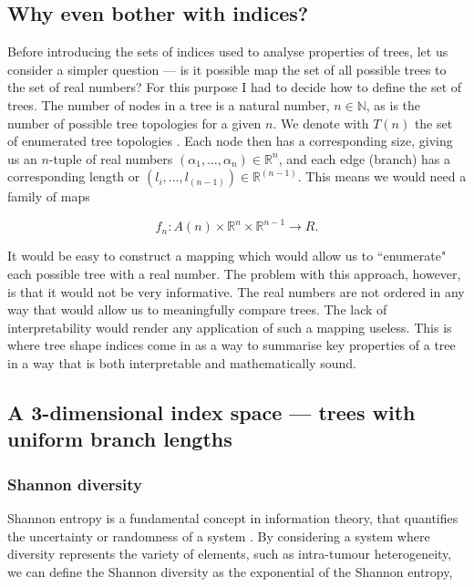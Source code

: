 \subsection{Why even bother with indices?}
Before introducing the sets of indices used to analyse properties of trees, let
us consider a simpler question --- is it possible map the set of all possible
trees to the set of real numbers? For this purpose I had to decide how to
define the set of trees. The number of nodes in a tree is a natural number,
$n\in\mathbb{N}$, as is the number of possible tree topologies for a given $n$.
We denote with $T(n)$ the set of enumerated tree topologies
\cite{nakano_tree_2016}. Each node then has a corresponding size, giving us an
$n$-tuple of real numbers $(\alpha_1, \dots, \alpha_n)\in\mathbb{R}^n$, and
each edge (branch) has a corresponding length or $(l_i, \dots,
l_{(n-1)})\in\mathbb{R}^{(n-1)}$. This means we would need a family of maps

\begin{equation}
    f_n: A(n) \times \mathbb{R}^n \times \mathbb{R}^{n-1} \rightarrow R.
\end{equation}

It would be easy to construct a mapping which would allow us to ``enumerate"
each possible tree with a real number. The problem with this approach, however,
is that it would not be very informative. The real numbers are not ordered in
any way that would allow us to meaningfully compare trees. The lack of
interpretability would render any application of such a mapping useless. This is
where tree shape indices come in as a way to summarise key properties of a tree
in a way that is both interpretable and mathematically sound.

\subsection{A 3-dimensional index space --- trees with uniform branch lengths}

\subsubsection{Shannon diversity}
Shannon entropy is a fundamental concept in information theory, that quantifies
the uncertainty or randomness of a system \cite{shannon_mathematical_1948}. By
considering a system where diversity represents the variety of elements, such as
intra-tumour heterogeneity, we can define the Shannon diversity as the
exponential of the Shannon entropy,

